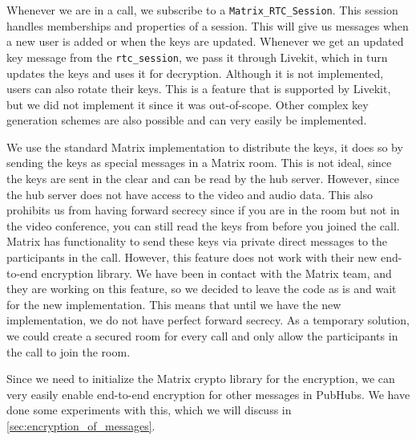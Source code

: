 \documentclass{report}
\begin{document}
Whenever we are in a call, we subscribe to a \lstinline[language=js]{Matrix_RTC_Session}. This session handles
memberships and properties of a session. This will give us messages when a new user is added or when the keys are
updated. Whenever we get an updated key message from the \lstinline[language=js]{rtc_session}, we pass it through
Livekit, which in turn updates the keys and uses it for decryption. Although it is not implemented, users can also rotate
their keys. This is a feature that is supported by Livekit, but we did not implement it since it was out-of-scope.
Other complex key generation schemes are also possible and can very easily be implemented.

We use the standard Matrix implementation to distribute the keys, it does so by sending the keys as special
messages in a Matrix room. This is not ideal, since the keys are sent in the clear and can be read by the hub server.
However, since the hub server does not have access to the video and audio data. This also prohibits us from having
forward secrecy since if you are in the room but not in the video conference, you can still read the keys from
before you joined the call. Matrix has functionality to send these keys via private direct messages to the
participants in the call. However, this feature does not work with their new end-to-end encryption library. We have
been in contact with the Matrix team, and they are working on this feature, so we decided to leave the code as is
and wait for the new implementation. This means that until we have the new implementation, we do not have perfect
forward secrecy. As a temporary solution, we could create a secured room for every call and only allow the
participants in the call to join the room.

Since we need to initialize the Matrix crypto library for the encryption, we can very easily enable end-to-end
encryption for other messages in PubHubs. We have done some experiments with this, which we will discuss in \autoref{sec:encryption_of_messages}.
\end{document}
